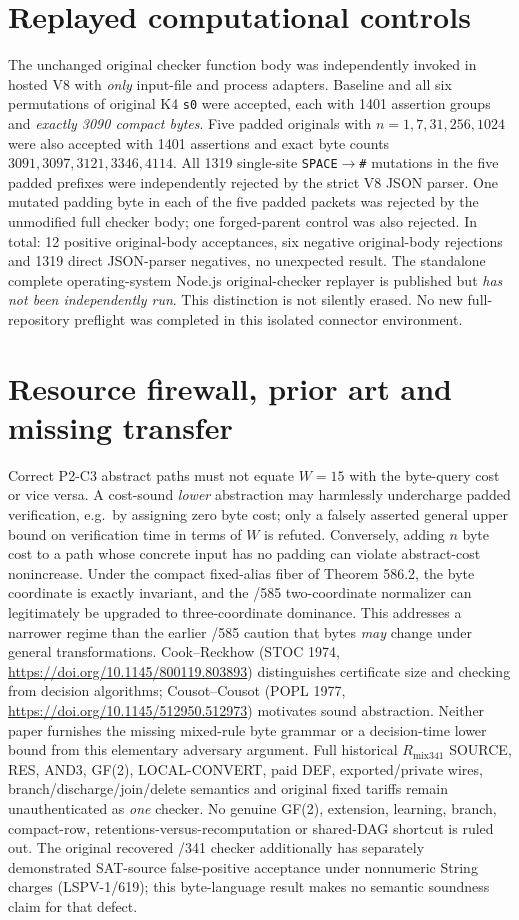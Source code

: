 \documentclass[11pt]{article}
\begin{document}
\section*{Replayed computational controls}
The unchanged original checker function body was independently invoked in hosted V8 with \emph{only} input-file and process adapters. Baseline and all six permutations of original K4 \texttt{s0} were accepted, each with 1401 assertion groups and \emph{exactly 3090 compact bytes}. Five padded originals with $n=1,7,31,256,1024$ were also accepted with 1401 assertions and exact byte counts $3091,3097,3121,3346,4114$. All 1319 single-site \texttt{SPACE}$\to$\texttt{\#} mutations in the five padded prefixes were independently rejected by the strict V8 JSON parser. One mutated padding byte in each of the five padded packets was rejected by the unmodified full checker body; one forged-parent control was also rejected. In total: 12 positive original-body acceptances, six negative original-body rejections and 1319 direct JSON-parser negatives, no unexpected result.
The standalone complete operating-system Node.js original-checker replayer is published but \emph{has not been independently run}. This distinction is not silently erased. No new full-repository preflight was completed in this isolated connector environment.
\section*{Resource firewall, prior art and missing transfer}
Correct P2-C3 abstract paths must not equate $W=15$ with the byte-query cost or vice versa. A cost-sound \emph{lower} abstraction may harmlessly undercharge padded verification, e.g.\ by assigning zero byte cost; only a falsely asserted general upper bound on verification time in terms of $W$ is refuted. Conversely, adding $n$ byte cost to a path whose concrete input has no padding can violate abstract-cost nonincrease. Under the compact fixed-alias fiber of Theorem 586.2, the byte coordinate is exactly invariant, and the /585 two-coordinate normalizer can legitimately be upgraded to three-coordinate dominance. This addresses a narrower regime than the earlier /585 caution that bytes \emph{may} change under general transformations.
Cook--Reckhow (STOC 1974, \url{https://doi.org/10.1145/800119.803893}) distinguishes certificate size and checking from decision algorithms; Cousot--Cousot (POPL 1977, \url{https://doi.org/10.1145/512950.512973}) motivates sound abstraction. Neither paper furnishes the missing mixed-rule byte grammar or a decision-time lower bound from this elementary adversary argument. Full historical $R_{\mathrm{mix341}}$ SOURCE, RES, AND3, GF(2), LOCAL-CONVERT, paid DEF, exported/private wires, branch/discharge/join/delete semantics and original fixed tariffs remain unauthenticated as \emph{one} checker. No genuine GF(2), extension, learning, branch, compact-row, retentions-versus-recomputation or shared-DAG shortcut is ruled out. The original recovered /341 checker additionally has separately demonstrated SAT-source false-positive acceptance under nonnumeric String charges (LSPV-1/619); this byte-language result makes no semantic soundness claim for that defect.
\end{document}
